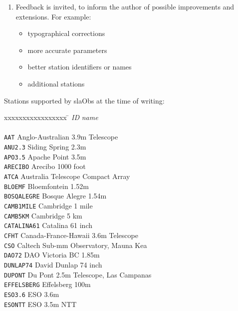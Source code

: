 \documentclass[11pt,fleqn,twoside]{article}
\renewcommand{\_}{{\tt\char'137}}     %
\begin{document}
{\begin{enumerate}
        the opposite of the one now used; elsewhere in
        SLALIB the preferable east-positive convention is used.  In
        particular, note that for use in {\tt slaAop}, {\tt slaAoppa} and
        {\tt slaOap} the sign of the longitude must be reversed.
  \item Feedback is invited, to inform the author of
        possible improvements and extensions.  For example:
        \begin{itemize}
         \item typographical corrections
         \item more accurate parameters
         \item better station identifiers or names
         \item additional stations
        \end{itemize}
 \end{enumerate}
Stations supported by slaObs at the time of writing:
\begin{tabbing}
xxxxxxxxxxxxxxxxx \= \kill
{\it ID} \> {\it name} \\ \\
{\tt AAT} \> Anglo-Australian 3.9m Telescope \\
{\tt ANU2.3} \> Siding Spring 2.3m \\
{\tt APO3.5} \> Apache Point 3.5m \\
{\tt ARECIBO} \> Arecibo 1000 foot \\
{\tt ATCA} \> Australia Telescope Compact Array \\
{\tt BLOEMF} \> Bloemfontein 1.52m \\
{\tt BOSQALEGRE} \> Bosque Alegre 1.54m \\
{\tt CAMB1MILE} \> Cambridge 1 mile \\
{\tt CAMB5KM} \> Cambridge 5 km \\
{\tt CATALINA61} \> Catalina 61 inch \\
{\tt CFHT} \> Canada-France-Hawaii 3.6m Telescope \\
{\tt CSO} \> Caltech Sub-mm Observatory, Mauna Kea \\
{\tt DAO72} \> DAO Victoria BC 1.85m \\
{\tt DUNLAP74} \> David Dunlap 74 inch \\
{\tt DUPONT} \> Du Pont 2.5m Telescope, Las Campanas \\
{\tt EFFELSBERG} \> Effelsberg 100m \\
{\tt ESO3.6} \> ESO 3.6m \\
{\tt ESONTT} \> ESO 3.5m NTT \\

\end{tabbing}}
\end{document}
